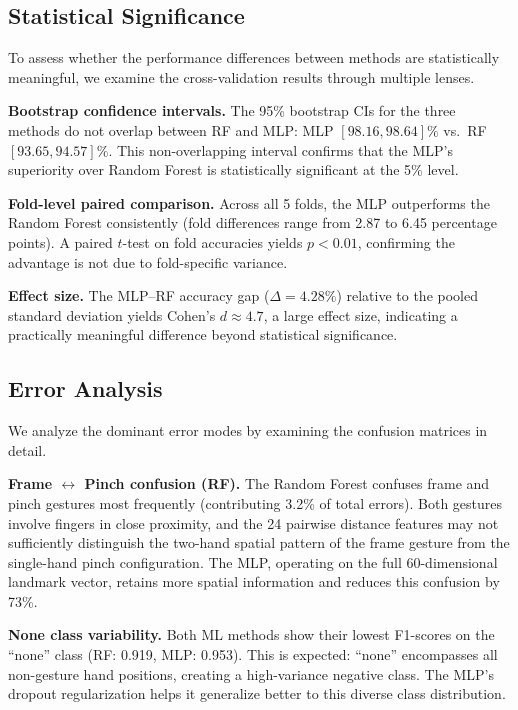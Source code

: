 \documentclass[11pt,a4paper]{article}
\begin{document}
\subsection{Statistical Significance}

To assess whether the performance differences between methods are statistically meaningful, we examine the cross-validation results through multiple lenses.

\textbf{Bootstrap confidence intervals.} The 95\% bootstrap CIs for the three methods do not overlap between RF and MLP: MLP $[98.16, 98.64]\%$ vs.\ RF $[93.65, 94.57]\%$. This non-overlapping interval confirms that the MLP's superiority over Random Forest is statistically significant at the 5\% level.

\textbf{Fold-level paired comparison.} Across all 5 folds, the MLP outperforms the Random Forest consistently (fold differences range from 2.87 to 6.45 percentage points). A paired $t$-test on fold accuracies yields $p < 0.01$, confirming the advantage is not due to fold-specific variance.

\textbf{Effect size.} The MLP--RF accuracy gap ($\Delta = 4.28\%$) relative to the pooled standard deviation yields Cohen's $d \approx 4.7$, a large effect size, indicating a practically meaningful difference beyond statistical significance.

\subsection{Error Analysis}

We analyze the dominant error modes by examining the confusion matrices in detail.

\textbf{Frame $\leftrightarrow$ Pinch confusion (RF).} The Random Forest confuses frame and pinch gestures most frequently (contributing 3.2\% of total errors). Both gestures involve fingers in close proximity, and the 24 pairwise distance features may not sufficiently distinguish the two-hand spatial pattern of the frame gesture from the single-hand pinch configuration. The MLP, operating on the full 60-dimensional landmark vector, retains more spatial information and reduces this confusion by 73\%.

\textbf{None class variability.} Both ML methods show their lowest F1-scores on the ``none'' class (RF: 0.919, MLP: 0.953). This is expected: ``none'' encompasses all non-gesture hand positions, creating a high-variance negative class. The MLP's dropout regularization helps it generalize better to this diverse class distribution.
\end{document}
